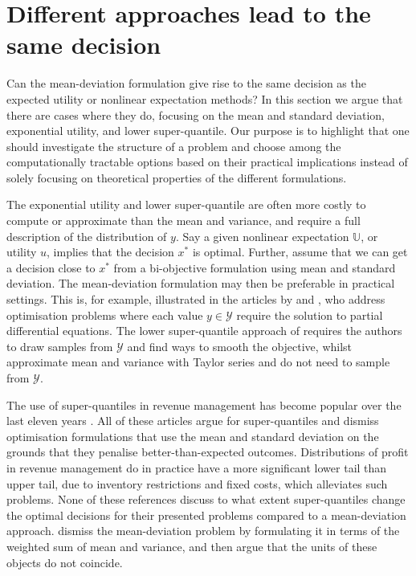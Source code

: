 \documentclass[main.tex]{subfiles}
\begin{document}
\section{Different approaches lead to the same decision}\label{sec:one_comparison_orderings}
Can the mean-deviation formulation give rise to the same decision
as the expected utility or nonlinear expectation methods?
In this section we argue that there are cases where they do,
focusing on the mean and standard deviation, exponential
utility, and lower super-quantile.
Our purpose is to highlight that one should investigate the structure of
a problem and choose among the computationally tractable options based
on their practical implications instead of solely focusing on
theoretical properties of the different formulations.


The exponential utility and lower super-quantile are often more costly
to compute or approximate than the mean and variance, and require a
full description of the distribution of $y$.
Say a given nonlinear expectation $\mathbb{U}$, or utility $u$,
implies that the decision $x^*$ is optimal. Further, assume that we can get a
decision close to $x^*$ from a bi-objective formulation using mean and standard
deviation. The mean-deviation formulation may then be preferable in
practical settings.
This is, for example, illustrated in the articles by
\citet{kouri2016risk} and \citet{alexanderian2017mean}, who address optimisation problems
where each value $y\in\mathcal{Y}$ require the solution to partial
differential equations.
The lower super-quantile approach of \citet{kouri2016risk}
requires the authors to draw samples from $\mathcal{Y}$ and find ways
to smooth the objective,
whilst \citet{alexanderian2017mean} approximate mean and variance
with Taylor series and do not need to sample from $\mathcal{Y}$.


The use of super-quantiles in revenue management has become popular
over the last eleven years
\citep{wu2014risk,xue2015optimal,zhou2008optimal,ahmed2007coherent}.
All of these articles argue for super-quantiles and dismiss
optimisation formulations that use the mean and standard deviation
on the grounds that they penalise better-than-expected outcomes.
Distributions of profit in revenue management do in practice
have a more significant lower tail than upper tail, due to inventory
restrictions and fixed costs, which alleviates such problems.
None of these references discuss to what extent super-quantiles change the
optimal decisions for their presented problems compared to a
mean-deviation approach. \citet{choi2011multiproduct}
dismiss the mean-deviation problem by formulating it in terms of the weighted sum of mean and
variance, and then argue that the units of these objects do not
coincide.
\end{document}
